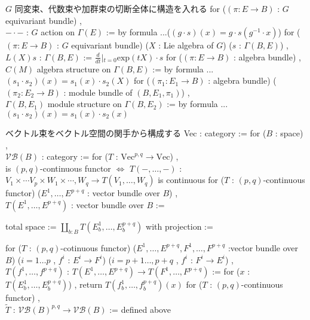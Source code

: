 \begin{Definition}
\itemnote
  \(G\) 同変束、代数束や加群束の切断全体に構造を入れる
\itemdefi
  for (\((\pi : E \to B)\) : \(G\) equivariant bundle) ,\\
  \(- \cdot -\) : \(G\) action on \(\Gamma(E)\) := by formula ...(\((g \cdot s)(x) = g \cdot s(g^{-1} \cdot x)\))
\itemdefi
  for (\((\pi : E \to B)\) : \(G\) equivariant bundle) (\(X\) : Lie algebra of \(G\)) (\(s\) : \(\Gamma(B , E)\)) ,\\
  \(L(X)s\) : \(\Gamma(B , E)\) := \(\frac{d}{dt}\left|_{t=0} \text{exp}(t X) \cdot s \right.\)
\itemdefi
  for (\((\pi : E \to B)\) : algebra bundle) ,\\
  \(C(M)\) algebra structure on \(\Gamma(B , E)\) := by formula ...\((s_1 \cdot s_2)(x) = s_1(x) \cdot s_2(X)\)
\itemdefi
  for (\((\pi_1 : E_1 \to B)\) : algebra bundle) (\((\pi_2 : E_2 \to B)\) : module bundle of \((B , E_1 , \pi_1)\)) ,\\
  \(\Gamma(B , E_1)\) module structure on \(\Gamma(B , E_2)\) := by formula ...\((s_1 \cdot s_2)(x) = s_1(x) \cdot s_2(x)\)
\end{Definition}

\begin{Definition}
\itemnote
  ベクトル束をベクトル空間の関手から構成する
\itemdefi
  Vec : category := 
\itemdefi
  for (\(B\) : space) ,\\
  \(\mathcal{VB}(B)\) : category := 
\itemdefi
  for (\(T\) : \(\text{Vec}^{p,q} \to \text{Vec}\)) ,\\
  is \((p,q)\)-continuous functor \(\iff\) \(T(- , \ldots , -)\) : \(V_1 \times \cdots V_p \times W_1 \times \cdots , W_q \to T(V_1 , \ldots , W_q)\) is continuous 
\itemdefi
  for (\(T\) : \((p,q)\)-continuous functor) (\(E^1 , \ldots , E^{p + q}\) : vector bundle over \(B\)) ,\\
  \(T(E^1 , \ldots , E^{p + q})\) : vector bundle over \(B\) :=
  \begin{itemize}
    \itemenum total space := \(\coprod_{b : B} T(E^1_b , \ldots , E^{p + q}_b)\) with 
    \itemenum projection := 
  \end{itemize}
\itemdefi
  for (\(T\) : \((p,q)\)-cotinuous functor) (\(E^1 , \ldots , E^{p + q} , F^1 , \ldots , F^{p + q}\) :vector bundle over \(B\)) (\(i = 1 \ldots p\) , \(f^i\) : \(E^i \to F^i\)) (\(i = p + 1 \ldots , p + q\) , \(f^i\) : \(F^i \to E^i\)) ,\\
  \(T(f^1 , \ldots , f^{p + q})\) : \(T(E^1 , \ldots , E^{p + q}) \to T(F^1 , \ldots , F^{p + q})\) := for (\(x\) : \(T(E^1_b , \ldots , E^{p + q}_b)\)) , return \(T(f^1_b , \ldots , f^{p + q}_b)(x)\)
\itemdefi
  for (\(T\) : \((p,q)\)-continuous functor) ,\\
  \(\tilde{T}\) : \(\mathcal{VB}(B)^{p,q} \to \mathcal{VB}(B)\) := defined above
\end{Definition}

